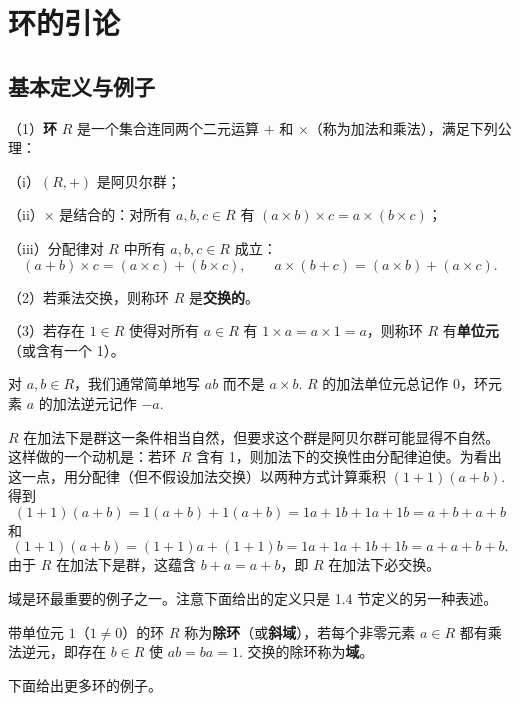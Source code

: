 

\setcounter{chapter}{6}

\chapter{环的引论}

\section{基本定义与例子}

\begin{definition}
（1）\textbf{环} \(R\) 是一个集合连同两个二元运算 \(+\) 和 \(\times\)（称为加法和乘法），满足下列公理：

（i）\((R, +)\) 是阿贝尔群；

（ii）\(\times\) 是结合的：对所有 \(a, b, c \in R\) 有 \((a \times b) \times c = a \times (b \times c)\)；

（iii）分配律对 \(R\) 中所有 \(a, b, c \in R\) 成立：
\[
(a+b)\times c = (a\times c) + (b\times c), \qquad a\times(b+c) = (a\times b) + (a\times c).
\]

（2）若乘法交换，则称环 \(R\) 是\textbf{交换的}。

（3）若存在 \(1 \in R\) 使得对所有 \(a \in R\) 有 \(1 \times a = a \times 1 = a\)，则称环 \(R\) 有\textbf{单位元}（或含有一个 1）。
\end{definition}

对 \(a, b \in R\)，我们通常简单地写 \(ab\) 而不是 \(a \times b\). \(R\) 的加法单位元总记作 \(0\)，环元素 \(a\) 的加法逆元记作 \(-a\).

\(R\) 在加法下是群这一条件相当自然，但要求这个群是阿贝尔群可能显得不自然。这样做的一个动机是：若环 \(R\) 含有 1，则加法下的交换性由分配律迫使。为看出这一点，用分配律（但不假设加法交换）以两种方式计算乘积 \((1+1)(a+b)\). 得到
\[
(1+1)(a+b) = 1(a+b) + 1(a+b) = 1a+1b+1a+1b = a+b+a+b
\]
和
\[
(1+1)(a+b) = (1+1)a + (1+1)b = 1a+1a+1b+1b = a+a+b+b.
\]
由于 \(R\) 在加法下是群，这蕴含 \(b+a = a+b\)，即 \(R\) 在加法下必交换。

域是环最重要的例子之一。注意下面给出的定义只是 1.4 节定义的另一种表述。

\begin{definition}
带单位元 \(1\)（\(1 \neq 0\)）的环 \(R\) 称为\textbf{除环}（或\textbf{斜域}），若每个非零元素 \(a \in R\) 都有乘法逆元，即存在 \(b \in R\) 使 \(ab = ba = 1\). 交换的除环称为\textbf{域}。
\end{definition}

下面给出更多环的例子。

